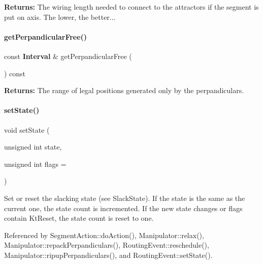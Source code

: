 {\bfseries Returns\+:} The wiring length needed to connect to the attractors if the segment is put on {\ttfamily axis}. The lower, the better... \mbox{\label{classKite_1_1DataNegociate_a60d12d642a8d232241a2b07febeb980b}} 
\paragraph{\texorpdfstring{get\+Perpandicular\+Free()}{getPerpandicularFree()}}
{\footnotesize\ttfamily const \textbf{ Interval} \& get\+Perpandicular\+Free (\begin{DoxyParamCaption}{ }\end{DoxyParamCaption}) const\hspace{0.3cm}{\ttfamily [inline]}}

{\bfseries Returns\+:} The range of legal positions generated only by the perpandiculars. \mbox{\label{classKite_1_1DataNegociate_aafc8cd0dcd351625a12904bed7d5a7d1}} 
\paragraph{\texorpdfstring{set\+State()}{setState()}}
{\footnotesize\ttfamily void set\+State (\begin{DoxyParamCaption}\item[{unsigned int}]{state,  }\item[{unsigned int}]{flags = {} }\end{DoxyParamCaption})\hspace{0.3cm}{\ttfamily [inline]}}

Set or reset the slacking state (see Slack\+State). If the {\ttfamily state} is the same as the current one, the state count is incremented. If the new state changes or {\ttfamily flags} contain Kt\+Reset, the state count is reset to one. 

Referenced by Segment\+Action\+::do\+Action(), Manipulator\+::relax(), Manipulator\+::repack\+Perpandiculars(), Routing\+Event\+::reschedule(), Manipulator\+::ripup\+Perpandiculars(), and Routing\+Event\+::set\+State().

